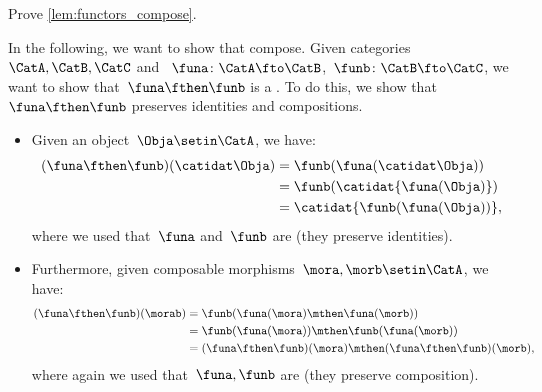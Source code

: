 \begin{exercise}
    Prove \cref{lem:functors_compose}.
\end{exercise}
\begin{solution}
    In the following, we want to show that  compose.
    Given categories~$\CatA,\CatB,\CatC$ and ~$\funa\colon \CatA\fto \CatB$,~$\funb \colon \CatB\fto \CatC$, we want to show that~$\funa\fthen\funb$ is a .
    To do this, we show that~$\funa\fthen\funb$ preserves identities and compositions.
    \begin{itemize}
        \item Given an object~$\Obja\setin \CatA$, we have:
              \begin{equation}\label{eq:functor-comp-proof-1}
                  \begin{aligned}
                      (\funa\fthen\funb)(\catidat\Obja)
                       & =\funb(\funa(\catidat\Obja)) \\
                       & =\funb(\catidat{\funa(\Obja)}) \\
                       & =\catidat{\funb(\funa(\Obja))},
                  \end{aligned}
              \end{equation}
              where we used that~$\funa$ and~$\funb$ are  (they preserve identities).
        \item Furthermore, given composable morphisms~$\mora,\morb\setin \CatA$, we have:
              \begin{equation}\label{eq:functor-comp-proof-2}
                  \begin{aligned}
                      (\funa\fthen\funb)(\morab)
                       & =\funb(\funa(\mora)\mthen \funa(\morb)) \\
                       & =\funb(\funa(\mora))\mthen \funb(\funa(\morb)) \\
                       & = (\funa\fthen\funb)(\mora) \mthen (\funa\fthen\funb)(\morb),
                  \end{aligned}
              \end{equation}
              where again we used that~$\funa,\funb$ are  (they preserve composition).
    \end{itemize}
\end{solution}


